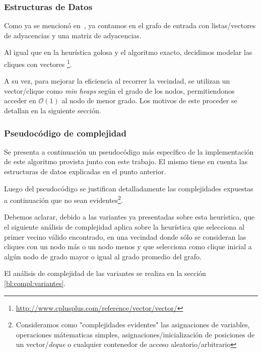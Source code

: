 \subsubsection{Estructuras de Datos}
\par Como ya se mencion\'o en~, ya contamos en el grafo
    de entrada con listas/vectores de adyacencias y una matriz de adyacencias.

\par Al igual que en la heur\'istica golosa y el algoritmo exacto, decidimos
    modelar las cliques con vectores%
    \footnote{\url{http://www.cplusplus.com/reference/vector/vector/}}.

\par A su vez, para mejorar la eficiencia al recorrer la vecindad, se
    utilizan un vector/clique como \emph{min heaps} seg\'un el grado
    de los nodos, permitiendonos acceder en $\mathcal O(1)$ al nodo
    de menor grado. Los motivos de este proceder se detallan en
    la siguiente secci\'on.

\subsubsection{Pseudoc\'odigo de complejidad}
\par Se presenta a continuaci\'on un pseudoc\'odigo m\'as espec\'ifico de la implementaci\'on
    de este algoritmo provista junto con este trabajo. El mismo tiene en cuenta
    las estructuras de datos explicadas en el punto anterior.

\par Luego del pseudoc\'odigo se justifican detalladamente las complejidades
    expuestas a continuaci\'on que no sean evidentes\footnote{Consideramos
    como "complejidades evidentes" las asignaciones de variables, operaciones
    m\'atematicas simples, asignaciones/inicializaci\'on de posiciones de
    un vector/\emph{deque} o cualquier contenedor de acceso aleatorio/arbitrario}.

\par Debemos aclarar, debido a las variantes ya presentadas sobre esta
    heur\'istica, que el siguiente an\'alisis de complejidad aplica
    sobre la heur\'istica que selecciona al primer vecino v\'alido encontrado,
    en una vecindad donde s\'olo se consideran las cliques con un nodo m\'as
    o un nodo menos y que selecciona como clique inicial a alg\'un nodo
    de grado mayor o igual al grado promedio del grafo.

\par El an\'alisis de complejidad de las variantes se realiza en la secci\'on
    \ref{bl:compl:variantes}.

